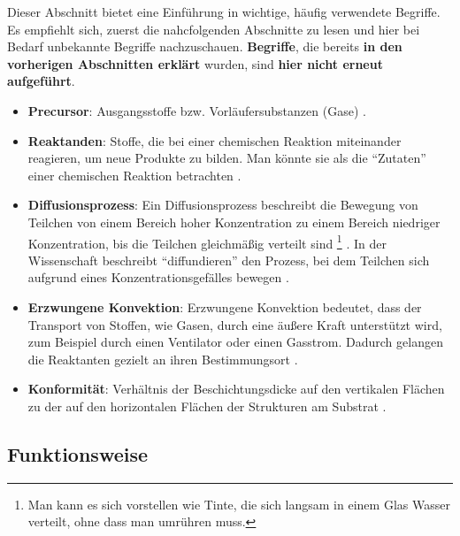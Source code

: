 \documentclass{article} %
\begin{document}
Dieser Abschnitt bietet eine Einführung in wichtige, häufig verwendete Begriffe. Es empfiehlt sich, zuerst die nahcfolgenden Abschnitte zu lesen und hier bei Bedarf unbekannte Begriffe nachzuschauen. \textbf{Begriffe}, die bereits \textbf{in den vorherigen Abschnitten erklärt} wurden, sind \textbf{hier nicht erneut aufgeführt}.

\begin{itemize}
    \item \textbf{Precursor}: Ausgangsstoffe bzw. Vorläufersubstanzen (Gase) \cite{keplinger2024CVD}. 
    \item \textbf{Reaktanden}: Stoffe, die bei einer chemischen Reaktion miteinander reagieren, um neue Produkte zu bilden. Man könnte sie als die ``Zutaten'' einer chemischen Reaktion betrachten \cite{petrucci_general_chemistry, chang_chemistry}.
    \item \textbf{Diffusionsprozess}: Ein Diffusionsprozess beschreibt die Bewegung von Teilchen von einem Bereich hoher Konzentration zu einem Bereich niedriger Konzentration, bis die Teilchen gleichmäßig verteilt sind \footnote{Man kann es sich vorstellen wie Tinte, die sich langsam in einem Glas Wasser verteilt, ohne dass man umrühren muss.} \cite{bergman2011, incropera2007}. In der Wissenschaft beschreibt ``diffundieren'' den Prozess, bei dem Teilchen sich aufgrund eines Konzentrationsgefälles bewegen \cite{crank1975}.
    \item \textbf{Erzwungene Konvektion}: Erzwungene Konvektion bedeutet, dass der Transport von Stoffen, wie Gasen, durch eine äußere Kraft unterstützt wird, zum Beispiel durch einen Ventilator oder einen Gasstrom. Dadurch gelangen die Reaktanten gezielt an ihren Bestimmungsort \cite{incropera2007, bergman2011, kays2005, bejan2013}.
    \item \textbf{Konformität}: Verhältnis der Beschichtungsdicke auf den vertikalen Flächen zu der auf den horizontalen Flächen der Strukturen am Substrat \cite{keplinger2024CVD}.
\end{itemize}





\vspace{1em}

\subsection{Funktionsweise} %
\end{document}
